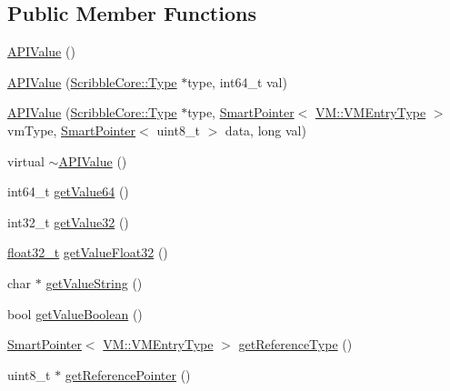 \subsection*{Public Member Functions}
\begin{DoxyCompactItemize}
\item 
\hyperlink{class_a_p_i_1_1_a_p_i_value_ac687584e4a3f04eded7a7b2e178331ae}{A\-P\-I\-Value} ()
\item 
\hyperlink{class_a_p_i_1_1_a_p_i_value_aa9c18784d818a39bf8ff1f91a5a9fa44}{A\-P\-I\-Value} (\hyperlink{class_scribble_core_1_1_type}{Scribble\-Core\-::\-Type} $\ast$type, int64\-\_\-t val)
\item 
\hyperlink{class_a_p_i_1_1_a_p_i_value_ac6a9936ffcc934fd6e16fa9d26d2732c}{A\-P\-I\-Value} (\hyperlink{class_scribble_core_1_1_type}{Scribble\-Core\-::\-Type} $\ast$type, \hyperlink{_smart_pointer_8hpp_afdd8d4ba81c3fcbdeacf1dafba2accfb}{Smart\-Pointer}$<$ \hyperlink{class_v_m_1_1_v_m_entry_type}{V\-M\-::\-V\-M\-Entry\-Type} $>$ vm\-Type, \hyperlink{_smart_pointer_8hpp_afdd8d4ba81c3fcbdeacf1dafba2accfb}{Smart\-Pointer}$<$ uint8\-\_\-t $>$ data, long val)
\item 
virtual \hyperlink{class_a_p_i_1_1_a_p_i_value_a3a23f788748db18999b767932abb0672}{$\sim$\-A\-P\-I\-Value} ()
\item 
int64\-\_\-t \hyperlink{class_a_p_i_1_1_a_p_i_value_a26380a603f4fc9191608f047e6ea8250}{get\-Value64} ()
\item 
int32\-\_\-t \hyperlink{class_a_p_i_1_1_a_p_i_value_ae56a74e043a259b1a219804cb77165d7}{get\-Value32} ()
\item 
\hyperlink{types_8h_a4611b605e45ab401f02cab15c5e38715}{float32\-\_\-t} \hyperlink{class_a_p_i_1_1_a_p_i_value_a2374ba437041f0c57514be649825312b}{get\-Value\-Float32} ()
\item 
char $\ast$ \hyperlink{class_a_p_i_1_1_a_p_i_value_a94eb3d9f4b1c0dfd397f6813fd8c8a94}{get\-Value\-String} ()
\item 
bool \hyperlink{class_a_p_i_1_1_a_p_i_value_a720e381988acbc87b34df8535d61e4d2}{get\-Value\-Boolean} ()
\item 
\hyperlink{_smart_pointer_8hpp_afdd8d4ba81c3fcbdeacf1dafba2accfb}{Smart\-Pointer}$<$ \hyperlink{class_v_m_1_1_v_m_entry_type}{V\-M\-::\-V\-M\-Entry\-Type} $>$ \hyperlink{class_a_p_i_1_1_a_p_i_value_adffeaebde4496d5ee7e9944f1aa4bb76}{get\-Reference\-Type} ()
\item 
uint8\-\_\-t $\ast$ \hyperlink{class_a_p_i_1_1_a_p_i_value_afaee05a374fbc7e04c9ceb9f4b0758af}{get\-Reference\-Pointer} ()
\item 

\end{DoxyCompactItemize}
